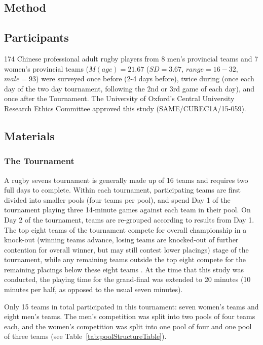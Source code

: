 \begin{CJK}{UTF8}{gbsn}
\clearpage

\section{Method}
\subsection{Participants}
174 Chinese professional adult rugby players from 8 men's provincial teams and 7 women's provincial teams ($M(age) = 21.67$ ($SD = 3.67$, $range = 16 - 32$, $male = 93$) were surveyed once before (2-4 days before), twice during (once each day of the two day tournament, following the 2nd or 3rd game of each day), and once after the Tournament.  The University of Oxford's Central University Research Ethics Committee approved this study (SAME/CUREC1A/15-059).

\subsection{Materials}

\subsubsection{The Tournament}
A rugby sevens tournament is generally made up of 16 teams and requires two full days to complete.  Within each tournament, participating teams are first divided into smaller pools (four teams per pool), and spend Day 1 of the tournament playing three 14-minute games against each team in their pool. On Day 2 of the tournament, teams are re-grouped according to results from Day 1.  The top eight teams of the tournament compete for overall championship in a knock-out (winning teams advance, losing teams are knocked-out of further contention for overall winner, but may still contest lower placings) stage of the tournament, while any remaining teams outside the top eight compete for the remaining placings below these eight teams \citep[][]{WorldRugby2018}. At the time that this study was conducted, the playing time for the grand-final was extended to 20 minutes (10 minutes per half, as opposed to the usual seven minutes).

Only 15 teams in total participated in this tournament: seven women's teams and eight men's teams. The men's competition was split into two pools of four teams each, and the women's competition was split into one pool of four and one pool of three teams (see Table~\ref{tab:poolStructureTable}).


\end{CJK}
